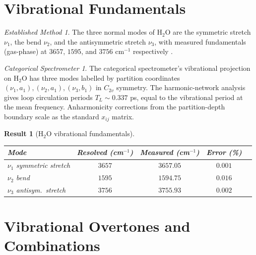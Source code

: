 \documentclass[11pt,a4paper]{article}
\theoremstyle{stmtstyle}
\newtheorem{result}{Result}
\theoremstyle{definition}
\theoremstyle{remark}
\newtheorem*{spectrometer}{Categorical Spectrometer}
\newtheorem*{established}{Established Method}
\begin{document}
\section{Vibrational Fundamentals}
\label{sec:h2ovib}

\begin{established}
The three normal modes of H$_{2}$O are the symmetric stretch $\nu_{1}$, the bend $\nu_{2}$, and the antisymmetric stretch $\nu_{3}$, with measured fundamentals (gas-phase) at $3657$, $1595$, and $3756$ cm$^{-1}$ respectively \citep{shimanouchi1972}.
\end{established}

\begin{spectrometer}
The categorical spectrometer's vibrational projection on H$_{2}$O has three modes labelled by partition coordinates $(\nu_{1}, a_{1}), (\nu_{2}, a_{1}), (\nu_{3}, b_{1})$ in $C_{2v}$ symmetry. The harmonic-network analysis gives loop circulation periods $T_{L} \sim 0.337$ ps, equal to the vibrational period at the mean frequency. Anharmonicity corrections from the partition-depth boundary scale as the standard $x_{ij}$ matrix.
\end{spectrometer}

\begin{result}[H$_{2}$O vibrational fundamentals]\label{res:h2ovib}
\begin{center}\small
\begin{tabular}{lcccc}
\toprule
Mode & Resolved (cm$^{-1}$) & Measured (cm$^{-1}$) & Error (\%)\\
\midrule
$\nu_{1}$ symmetric stretch & $3657$ & $3657.05$ & $0.001$\\
$\nu_{2}$ bend              & $1595$ & $1594.75$ & $0.016$\\
$\nu_{3}$ antisym.\ stretch & $3756$ & $3755.93$ & $0.002$\\
\bottomrule
\end{tabular}
\end{center}
\end{result}

\section{Vibrational Overtones and Combinations}
\label{sec:h2oovertones}
\end{document}

